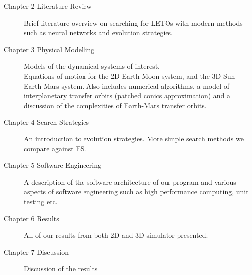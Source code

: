 \begin{description}
	\item[Chapter 2 Literature Review]{Brief literature overview on searching for LETOs with modern methods such as neural networks and evolution strategies.}
	\item[Chapter 3 Physical Modelling]{Models of the dynamical systems of interest. \\ Equations of motion for the 2D Earth-Moon system, and the 3D Sun-Earth-Mars system. Also includes numerical algorithms, a model of interplanetary transfer orbits (patched conics approximation) and a discussion of the complexities of Earth-Mars transfer orbits.}
	\item[Chapter 4 Search Strategies]{An introduction to evolution strategies. More simple search methods we compare against ES.}
	\item[Chapter 5 Software Engineering]{A description of the software architecture of our program and various aspects of software engineering such as high performance computing, unit testing etc.}
	\item[Chapter 6 Results]{All of our results from both 2D and 3D simulator presented.}
	\item[Chapter 7 Discussion]{Discussion of the results}
\end{description}


